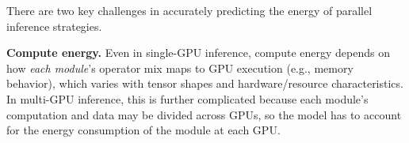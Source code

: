 \medskip
There are two key challenges in accurately predicting the energy of parallel inference strategies.

\noindent\textbf{Compute energy.}
Even in single-GPU inference, compute energy depends on how \emph{each module}'s operator mix maps to GPU execution (e.g., memory behavior), which varies with tensor shapes and hardware/resource characteristics. 
In multi-GPU inference, this is further complicated because each module's computation and data may be divided across GPUs, so the model has to account for the energy consumption of the module at each GPU.


